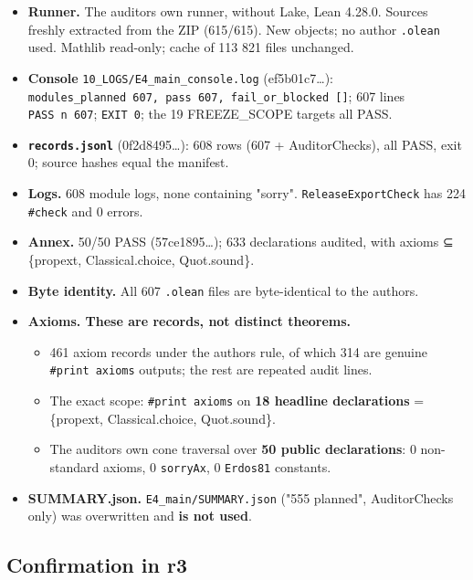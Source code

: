 \documentclass[
]{article}
\providecommand{\tightlist}{%
  \setlength{\itemsep}{0pt}\setlength{\parskip}{0pt}}
\begin{document}
\begin{itemize}
\tightlist
\item
  \textbf{Runner.} The auditor\textquotesingle s own runner, without
  Lake, Lean 4.28.0. Sources freshly extracted from the ZIP (615/615).
  New objects; no author \texttt{.olean} used. Mathlib read-only; cache
  of 113 821 files unchanged.
\item
  \textbf{Console} \texttt{10\_LOGS/E4\_main\_console.log}
  (ef5b01c7\ldots):
  \texttt{modules\_planned\ 607,\ pass\ 607,\ fail\_or\_blocked\ {[}{]}};
  607 lines \texttt{PASS\ n\ 607}; \texttt{EXIT\ 0}; the 19
  FREEZE\_SCOPE targets all PASS.
\item
  \textbf{\texttt{records.jsonl}} (0f2d8495\ldots): 608 rows (607 +
  AuditorChecks), all PASS, exit 0; source hashes equal the manifest.
\item
  \textbf{Logs.} 608 module logs, none containing "sorry".
  \texttt{ReleaseExportCheck} has 224 \texttt{\#check} and 0 errors.
\item
  \textbf{Annex.} 50/50 PASS (57ce1895\ldots); 633 declarations audited,
  with axioms ⊆ \{propext, Classical.choice, Quot.sound\}.
\item
  \textbf{Byte identity.} All 607 \texttt{.olean} files are
  byte-identical to the author\textquotesingle s.
\item
  \textbf{Axioms. These are records, not distinct theorems.}

  \begin{itemize}
  \tightlist
  \item
    461 axiom records under the author\textquotesingle s rule, of which
    314 are genuine \texttt{\#print\ axioms} outputs; the rest are
    repeated audit lines.
  \item
    The exact scope: \texttt{\#print\ axioms} on \textbf{18 headline
    declarations} = \{propext, Classical.choice, Quot.sound\}.
  \item
    The auditor\textquotesingle s own cone traversal over \textbf{50
    public declarations}: 0 non-standard axioms, 0 \texttt{sorryAx}, 0
    \texttt{Erdos81} constants.
  \end{itemize}
\item
  \textbf{SUMMARY.json.} \texttt{E4\_main/SUMMARY.json} ("555 planned",
  AuditorChecks only) was overwritten and \textbf{is not used}.
\end{itemize}

\subsection{Confirmation in r3}\label{confirmation-in-r3}
\end{document}

